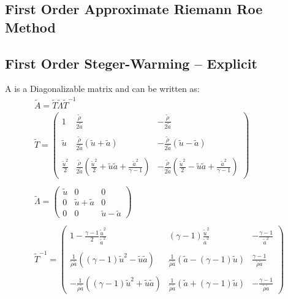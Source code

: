 \documentclass[11pt, a4paper]{article}
\begin{document}
\subsection{First Order Approximate Riemann Roe Method}

\subsection{First Order Steger-Warming -- Explicit}
A is a Diagonalizable matrix and can be written as:
\begin{equation}
    \begin{array}{c}
        \tilde{A}=\tilde{T}\tilde{\Lambda}\tilde{T}^{-1} \\
        \tilde{T}=\begin{pmatrix}
            1 & \displaystyle\frac{\tilde{\rho}}{2\tilde{a}} & \displaystyle-\frac{\tilde{\rho}}{2\tilde{a}} \\\\
            \tilde{u} & \displaystyle\frac{\tilde{\rho}}{2\tilde{a}}\left(\tilde{u}+\tilde{a}\right) & \displaystyle-\frac{\tilde{\rho}}{2\tilde{a}}\left(\tilde{u}-\tilde{a}\right) \\\\
            \displaystyle\frac{\tilde{u}^2}{2} & \displaystyle\frac{\tilde{\rho}}{2\tilde{a}}\left(\frac{\tilde{u}^2}{2}+\tilde{u}\tilde{a}+\frac{\tilde{a}^2}{\gamma-1}\right) & \displaystyle-\frac{\tilde{\rho}}{2\tilde{a}}\left(\frac{\tilde{u}^2}{2}-\tilde{u}\tilde{a}+\frac{\tilde{a}^2}{\gamma-1}\right)
        \end{pmatrix} \\\\
        \tilde{\Lambda}=\begin{pmatrix}
            \tilde{u} & 0 & 0 \\
            0 & \tilde{u}+\tilde{a} & 0 \\
            0 & 0 & \tilde{u}-\tilde{a}
        \end{pmatrix} \\\\
        \tilde{T}^{-1}=\begin{pmatrix}
            \displaystyle1-\frac{\gamma-1}{2}\frac{\tilde{u}^2}{\tilde{a}^2} & \displaystyle\left(\gamma-1\right)\frac{\tilde{u}^2}{\tilde{a}^2} & -\frac{\gamma-1}{\tilde{a}^2} \\\\
            \displaystyle\frac{1}{\tilde{\rho}\tilde{a}}\left(\left(\gamma-1\right)\tilde{u}^2-\tilde{u}\tilde{a}\right) & \displaystyle\frac{1}{\tilde{\rho}\tilde{a}}\left(\tilde{a}-\left(\gamma-1\right)\tilde{u}\right) & \displaystyle\frac{\gamma-1}{\tilde{\rho}\tilde{a}} \\\\
            \displaystyle-\frac{1}{\tilde{\rho}\tilde{a}}\left(\left(\gamma-1\right)\tilde{u}^2+\tilde{u}\tilde{a}\right) & \displaystyle\frac{1}{\tilde{\rho}\tilde{a}}\left(\tilde{a}+\left(\gamma-1\right)\tilde{u}\right) & \displaystyle-\frac{\gamma-1}{\tilde{\rho}\tilde{a}}
        \end{pmatrix}
    \end{array}
\end{equation}
\end{document}
